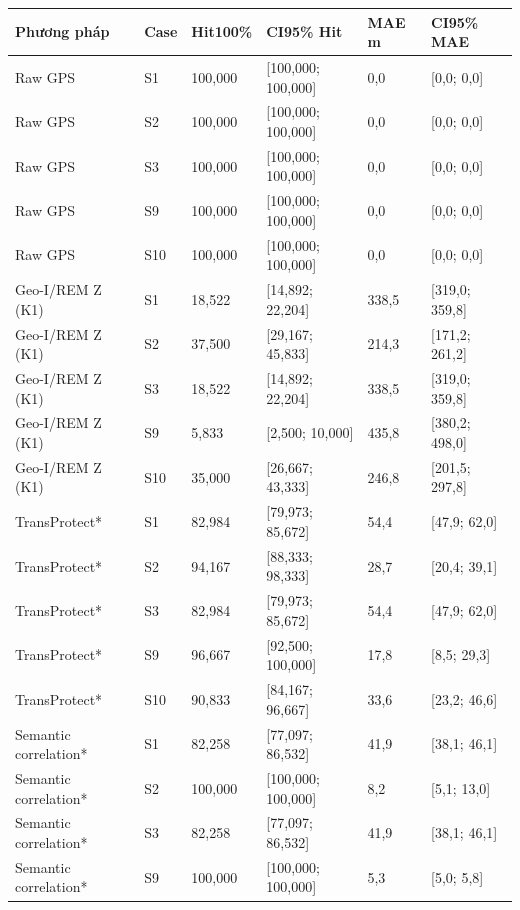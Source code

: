 \par\smallskip\noindent\begin{tabularx}{\linewidth}{@{}P{3.4cm}P{.7cm}XXXX@{}}\toprule
\textbf{Phương pháp} & \textbf{Case} & \textbf{Hit100\%} & \textbf{CI95\% Hit} & \textbf{MAE m} & \textbf{CI95\% MAE} \\
\midrule
Raw GPS & S1 & 100{,}000 & [100{,}000; 100{,}000] & 0{,}0 & [0{,}0; 0{,}0] \\
Raw GPS & S2 & 100{,}000 & [100{,}000; 100{,}000] & 0{,}0 & [0{,}0; 0{,}0] \\
Raw GPS & S3 & 100{,}000 & [100{,}000; 100{,}000] & 0{,}0 & [0{,}0; 0{,}0] \\
Raw GPS & S9 & 100{,}000 & [100{,}000; 100{,}000] & 0{,}0 & [0{,}0; 0{,}0] \\
Raw GPS & S10 & 100{,}000 & [100{,}000; 100{,}000] & 0{,}0 & [0{,}0; 0{,}0] \\
Geo-I/REM Z (K1) & S1 & 18{,}522 & [14{,}892; 22{,}204] & 338{,}5 & [319{,}0; 359{,}8] \\
Geo-I/REM Z (K1) & S2 & 37{,}500 & [29{,}167; 45{,}833] & 214{,}3 & [171{,}2; 261{,}2] \\
Geo-I/REM Z (K1) & S3 & 18{,}522 & [14{,}892; 22{,}204] & 338{,}5 & [319{,}0; 359{,}8] \\
Geo-I/REM Z (K1) & S9 & 5{,}833 & [2{,}500; 10{,}000] & 435{,}8 & [380{,}2; 498{,}0] \\
Geo-I/REM Z (K1) & S10 & 35{,}000 & [26{,}667; 43{,}333] & 246{,}8 & [201{,}5; 297{,}8] \\
TransProtect* & S1 & 82{,}984 & [79{,}973; 85{,}672] & 54{,}4 & [47{,}9; 62{,}0] \\
TransProtect* & S2 & 94{,}167 & [88{,}333; 98{,}333] & 28{,}7 & [20{,}4; 39{,}1] \\
TransProtect* & S3 & 82{,}984 & [79{,}973; 85{,}672] & 54{,}4 & [47{,}9; 62{,}0] \\
TransProtect* & S9 & 96{,}667 & [92{,}500; 100{,}000] & 17{,}8 & [8{,}5; 29{,}3] \\
TransProtect* & S10 & 90{,}833 & [84{,}167; 96{,}667] & 33{,}6 & [23{,}2; 46{,}6] \\
Semantic correlation* & S1 & 82{,}258 & [77{,}097; 86{,}532] & 41{,}9 & [38{,}1; 46{,}1] \\
Semantic correlation* & S2 & 100{,}000 & [100{,}000; 100{,}000] & 8{,}2 & [5{,}1; 13{,}0] \\
Semantic correlation* & S3 & 82{,}258 & [77{,}097; 86{,}532] & 41{,}9 & [38{,}1; 46{,}1] \\
Semantic correlation* & S9 & 100{,}000 & [100{,}000; 100{,}000] & 5{,}3 & [5{,}0; 5{,}8] \\

\end{tabularx}

